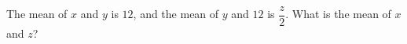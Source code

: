 The mean of $x$ and $y$ is $12$, and the mean of $y$ and $12$ is $\dfrac {z}{2}$. What is the mean of $x$ and $z$?
